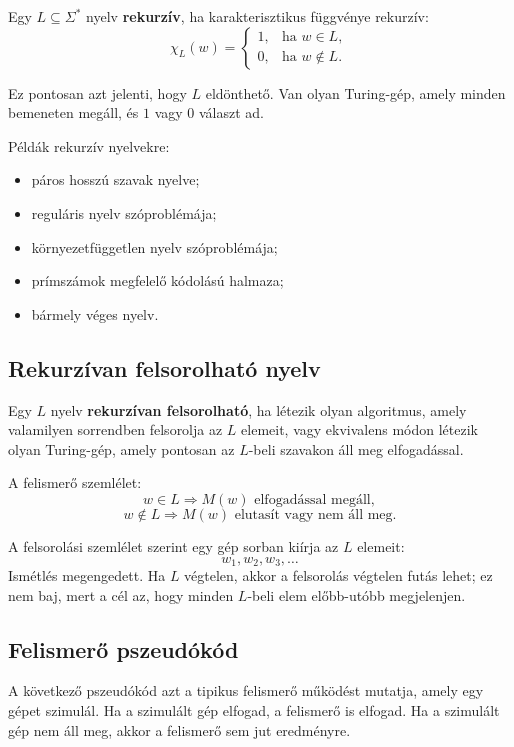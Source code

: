 Egy $L\subseteq\Sigma^*$ nyelv \textbf{rekurzív}, ha karakterisztikus függvénye rekurzív:
\[
  \chi_L(w)=
  \begin{cases}
    1, & \text{ha } w\in L,\\
    0, & \text{ha } w\notin L.
  \end{cases}
\]

Ez pontosan azt jelenti, hogy $L$ eldönthető. Van olyan Turing-gép, amely minden bemeneten megáll, és $1$ vagy $0$ választ ad.

Példák rekurzív nyelvekre:

\begin{itemize}
  \item páros hosszú szavak nyelve;
  \item reguláris nyelv szóproblémája;
  \item környezetfüggetlen nyelv szóproblémája;
  \item prímszámok megfelelő kódolású halmaza;
  \item bármely véges nyelv.
\end{itemize}

\subsection{Rekurzívan felsorolható nyelv}

Egy $L$ nyelv \textbf{rekurzívan felsorolható}, ha létezik olyan algoritmus, amely valamilyen sorrendben felsorolja az $L$ elemeit, vagy ekvivalens módon létezik olyan Turing-gép, amely pontosan az $L$-beli szavakon áll meg elfogadással.

A felismerő szemlélet:
\[
  w\in L \Rightarrow M(w) \text{ elfogadással megáll},
\]
\[
  w\notin L \Rightarrow M(w) \text{ elutasít vagy nem áll meg}.
\]

A felsorolási szemlélet szerint egy gép sorban kiírja az $L$ elemeit:
\[
  w_1,w_2,w_3,\ldots
\]
Ismétlés megengedett. Ha $L$ végtelen, akkor a felsorolás végtelen futás lehet; ez nem baj, mert a cél az, hogy minden $L$-beli elem előbb-utóbb megjelenjen.

\subsection{Felismerő pszeudókód}

A következő pszeudókód azt a tipikus felismerő működést mutatja, amely egy gépet szimulál. Ha a szimulált gép elfogad, a felismerő is elfogad. Ha a szimulált gép nem áll meg, akkor a felismerő sem jut eredményre.

